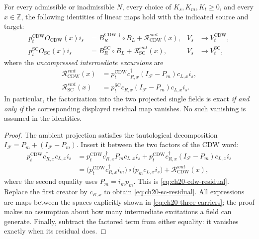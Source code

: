\begin{theorem}
\label{thm:ch20-projection-residual}
For every admissible or inadmissible \(N\), every choice of
\(K_s,K_m,K_t\geq0\), and every \(x\in\mathbb Z\), the following
identities of linear maps hold with the indicated source and target:
\begin{align}
 p_t^{\mathrm{CDW}}O_{\mathrm{CDW}}(x)i_s
 &=B_R^{\mathrm{CDW},\dagger}\circ B_L
   +\mathcal R_{\mathrm{CDW}}^{smt}(x),
 &V_s&\longrightarrow V_t^{\mathrm{CDW}},
 \label{eq:ch20-cdw-residual}\\
 p_t^{\mathrm{SC}}O_{\mathrm{SC}}(x)i_s
 &=B_R^{\mathrm{SC}}\circ B_L
   +\mathcal R_{\mathrm{SC}}^{smt}(x),
 &V_s&\longrightarrow V_t^{\mathrm{SC}},
 \label{eq:ch20-sc-residual}
\end{align}
where the \emph{uncompressed intermediate excursions} are
\begin{align}
 \mathcal R_{\mathrm{CDW}}^{smt}(x)
   &=p_t^{\mathrm{CDW}}c_{R,x}^{\dagger}(I_{\mathcal F}-P_m)
                                   c_{L,x}i_s,
 \label{eq:ch20-cdw-R}\\
 \mathcal R_{\mathrm{SC}}^{smt}(x)
   &=p_t^{\mathrm{SC}}c_{R,x}(I_{\mathcal F}-P_m)
                                   c_{L,x}i_s.
 \label{eq:ch20-sc-R}
\end{align}
In particular, the factorization into the two projected single fields
is exact \emph{if and only if} the corresponding displayed residual map
vanishes.  No such vanishing is assumed in the identities.
\end{theorem}

\begin{proof}
The ambient projection satisfies the tautological decomposition
\(I_{\mathcal F}=P_m+(I_{\mathcal F}-P_m)\).
Insert it between the two factors of the CDW word:
\begin{align*}
 p_t^{\mathrm{CDW}}c_{R,x}^{\dagger}c_{L,x}i_s
 & =p_t^{\mathrm{CDW}}c_{R,x}^{\dagger}P_m c_{L,x}i_s
   +p_t^{\mathrm{CDW}}c_{R,x}^{\dagger}
                        (I_{\mathcal F}-P_m)c_{L,x}i_s\\
 & =\bigl(p_t^{\mathrm{CDW}}c_{R,x}^{\dagger}i_m\bigr)
    \circ\bigl(p_m c_{L,x}i_s\bigr)
   +\mathcal R_{\mathrm{CDW}}^{smt}(x),
\end{align*}
where the second equality uses \(P_m=i_mp_m\).  This is
\eqref{eq:ch20-cdw-residual}.  Replace the first creator by
\(c_{R,x}\) to obtain \eqref{eq:ch20-sc-residual}.  All expressions
are maps between the spaces explicitly shown in
\eqref{eq:ch20-three-carriers}; the proof makes no assumption about
how many intermediate excitations a field can generate.
Finally, subtract the factored term from either equality: it vanishes
exactly when its residual does.
\end{proof}

